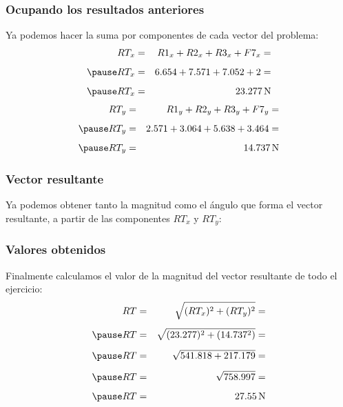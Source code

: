 \documentclass[14pt, xcolor={usenames,dvipsnames}]{beamer}
\begin{document}
\begin{frame}
\frametitle{Ocupando los resultados anteriores}
Ya podemos hacer la suma por componentes de cada vector del problema:
\begin{eqnarray*}
RT_{x} &=& R1_{x} + R2_{x} + R3_{x} + F7_{x} = \\[0.5em] \pause
RT_{x} &=& 6.654 + 7.571 + 7.052 + 2 = \\[0.5em] \pause
RT_{x} &=& \SI{23.277}{\newton}
\end{eqnarray*}
\pause
\begin{eqnarray*}
RT_{y} &=& R1_{y} + R2_{y} + R3_{y} + F7_{y} = \\[0.5em] \pause
RT_{y} &=& 2.571 + 3.064 + 5.638 + 3.464 = \\[0.5em] \pause
RT_{y} &=& \SI{14.737}{\newton}
\end{eqnarray*}
\end{frame}
\begin{frame}
\frametitle{Vector resultante}
\fontsize{12}{12}\selectfont
Ya podemos obtener tanto la magnitud como el ángulo que forma el vector resultante, a partir de las componentes $RT_{x}$ y $RT_{y}$:
\begin{figure}
\centering
{}
\end{figure}
\end{frame}
\begin{frame}
\frametitle{Valores obtenidos}
Finalmente calculamos el valor de la magnitud del vector resultante de todo el ejercicio:
\begin{eqnarray*}
RT &=& \sqrt{(RT_{x})^{2} + (RT_{y})^{2}} = \\[0.5em] \pause
RT &=& \sqrt{(23.277)^{2} + (14.737^{2})} = \\[0.5em] \pause
RT &=& \sqrt{541.818 + 217.179} = \\[0.5em] \pause
RT &=& \sqrt{758.997} = \\[0.5em] \pause
RT &=& \SI{27.55}{\newton}
\end{eqnarray*}
\end{frame}
\end{document}
